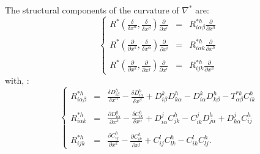 \documentclass[11pt,oneside,english]{amsart}
\numberwithin{equation}{section}
\numberwithin{figure}{section}
\theoremstyle{plain}
\theoremstyle{definition}
\theoremstyle{definition}
\theoremstyle{plain}
\theoremstyle{plain}
\theoremstyle{remark}
\theoremstyle{remark}
\begin{document}
The structural components of the curvature of $\nabla^{*}$ are: \begin{equation}
\left\{ \begin{array}{llll}
R^{*}(\frac{\delta}{\delta x^{\alpha}},\frac{\delta}{\delta x^{\beta}})\frac{\partial}{\partial x^{i}} & = & R_{i\alpha\beta}^{*h}\frac{\partial}{\partial x^{h}}\\
\\R^{*}(\frac{\partial}{\partial x^{k}},\frac{\delta}{\delta x^{\alpha}})\frac{\partial}{\partial x^{i}} & = & R_{i\alpha k}^{*h}\frac{\partial}{\partial x^{h}}\\
\\R^{*}(\frac{\partial}{\partial x^{k}},\frac{\partial}{\partial x^{j}})\frac{\partial}{\partial x^{i}} & = & R_{ijk}^{*h}\frac{\partial}{\partial x^{h}}\end{array}\right.\label{eq:26}\end{equation}
 with, \cite[p. 100]{b:f}: \begin{equation}
\left\{ \begin{array}{llll}
R_{i\alpha\beta}^{*h} & = & \frac{\delta D_{i\beta}^{h}}{\delta x^{\alpha}}-\frac{\delta D_{i\alpha}^{h}}{\delta x^{\beta}}+D_{i\beta}^{k}D_{k\alpha}^{h}-D_{i\alpha}^{k}D_{k\beta}^{h}-T_{\alpha\beta}^{*k}C_{ik}^{h}\\
\\R_{i\alpha k}^{*h} & = & \frac{\partial D_{i\alpha}^{h}}{\partial x^{k}}-\frac{\delta C_{ik}^{h}}{\delta x^{\alpha}}+D_{i\alpha}^{j}C_{jk}^{h}-C_{ik}^{j}D_{j\alpha}^{h}+D_{k\alpha}^{j}C_{ij}^{h}\\
\\R_{ijk}^{*h} & = & \frac{\partial C_{ij}^{h}}{\partial x^{k}}-\frac{\partial C_{ik}^{h}}{\partial x^{j}}+C_{ij}^{l}C_{lk}^{h}-C_{ik}^{l}C_{lj}^{h}.\end{array}\right.\label{eq:27}\end{equation}
\end{document}
